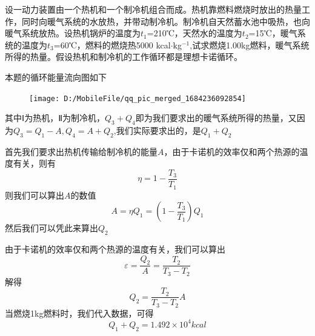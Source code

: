 \documentclass[lang=cn,10pt]{elegantbook}
\begin{document}
	\begin{example}
		设一动力装置由一个热机和一个制冷机组合而成。热机靠燃料燃烧时放出的热量工作，同时向暖气系统的水放热，并带动制冷机。制冷机自天然蓄水池中吸热，也向暖气系统放热。设热机锅炉的温度为$t_{1}$=210℃，天然水的温度为$t_{2}$=15℃，暖气系统的温度为$t_{3}$=60℃，燃料的燃烧热5000 kcal$\cdot$kg$^{-1}$,试求燃烧1.00kg燃料，暖气系统所得的热量。假设热机和制冷机的工作循环都是理想卡诺循环。	
	\end{example}
	\begin{solution}
		本题的循环能量流向图如下
		\begin{figure}[H]
			\centering
			\texttt{[image: D:/MobileFile/qq\_pic\_merged\_1684236092854]}
			\caption{}
			\label{fig:qqpicmerged1684236092854}
		\end{figure}
		其中Ⅰ为热机，Ⅱ为制冷机，$Q_{3}+Q_{4}$即为我们要求出的暖气系统所得的热量，又因为$Q_{3}=Q_{1}-A,Q_{4}=A+Q_{2}$,我们实际要求出的，是$Q_{1}+Q_{2}$
		
		
		首先我们要求出热机传输给制冷机的能量$A$，由于卡诺机的效率仅和两个热源的温度有关，则有
		\begin{equation*}
			\eta=1-\frac{T_{3}}{T_{1}}	
		\end{equation*}
		则我们可以算出$A$的数值
		\begin{equation*}
			A=\eta Q_{1}=(1-\frac{T_{3}}{T_{1}})	Q_{1}
		\end{equation*}
		然后我们可以凭此来算出$Q_{2}$
		
		由于卡诺机的效率仅和两个热源的温度有关，我们可以算出
		\begin{equation*}
			\varepsilon=\frac{Q_{2}}{A}=\frac{T_{2}}{T_{3}-T_{2}}
		\end{equation*}
		解得
		\begin{equation*}
			Q_{2}=\frac{T_{2}}{T_{3}-T_{2}}A
		\end{equation*}
		当燃烧1kg燃料时，我们代入数据，可得
		\begin{equation*}
			Q_{1}+Q_{2}=1.492\times10^{4}kcal
		\end{equation*}
	\end{solution}	
	
\end{document}
